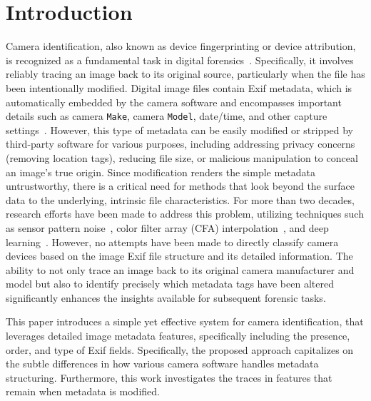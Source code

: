 \section{Introduction}

Camera identification, also known as device fingerprinting or device attribution, is recognized as a fundamental task in digital forensics~\cite{klier2025source}. 
Specifically, it involves reliably tracing an image back to its original source, particularly when the file has been intentionally modified.
Digital image files contain Exif metadata, which is automatically embedded by the camera software and encompasses important details such as camera \texttt{Make}, camera \texttt{Model}, date/time, and other capture settings~\cite{soni2025forensic}.
However, this type of metadata can be easily modified or stripped by third-party software for various purposes, including addressing privacy concerns (removing location tags), reducing file size, or malicious manipulation to conceal an image's true origin. 
Since modification renders the simple metadata untrustworthy, there is a critical need for methods that look beyond the surface data to the underlying, intrinsic file characteristics.
For more than two decades, research efforts have been made to address this problem, utilizing techniques such as sensor pattern noise~\cite{lukas2006digital}, color filter array (CFA) interpolation~\cite{bayram2005source}, and deep learning~\cite{freire2019deep}. 
However, no attempts have been made to directly classify camera devices based on the image Exif file structure and its detailed information.
The ability to not only trace an image back to its original camera manufacturer and model but also to identify precisely which metadata tags have been altered significantly enhances the insights available for subsequent forensic tasks.

This paper introduces a simple yet effective system for camera identification, that leverages detailed image metadata features, specifically including the presence, order, and type of Exif fields. 
Specifically, the proposed approach capitalizes on the subtle differences in how various camera software handles metadata structuring.
Furthermore, this work investigates the traces in features that remain when metadata is modified. 

